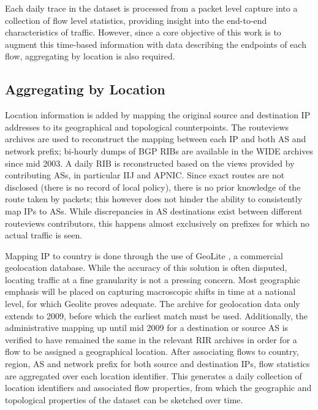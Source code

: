 Each daily trace in the dataset is processed from a packet level capture into a collection of flow level statistics, providing insight into the end-to-end characteristics of traffic. 
However, since a core objective of this work is to augment this time-based information with data describing the endpoints of each flow, aggregating by location is also required. 

\subsection{Aggregating by Location}

Location information is added by mapping the original source and destination \ac{IP} addresses to its geographical and topological counterpoints. 
The routeviews archives \cite{routeviews} are used to reconstruct the mapping between each \ac{IP} and both \ac{AS} and network prefix; bi-hourly dumps of \ac{BGP} \acp{RIB} are available in the \acs{WIDE} archives since mid 2003. 
A daily \ac{RIB} is reconstructed based on the views provided by contributing \acp{AS}, in particular \ac{IIJ} and \ac{APNIC}.
Since exact routes are not disclosed (there is no record of local policy), there is no prior knowledge of the route taken by packets; this however does not hinder the ability to consistently map \acp{IP} to \acp{AS}.
While discrepancies in \ac{AS} destinations exist between different routeviews contributors, this happens almost exclusively on prefixes for which no actual traffic is seen. 

Mapping \ac{IP} to country is done through the use of GeoLite \cite{maxmind}, a commercial geolocation database. 
While the accuracy of this solution is often disputed, locating traffic at a fine granularity is not a pressing concern.
Most geographic emphasis will be placed on capturing macroscopic shifts in time at a national level, for which Geolite proves adequate.
The archive for geolocation data only extends to 2009, before which the earliest match must be used.
Additionally, the administrative mapping up until mid 2009 for a destination or source \ac{AS} is verified to have remained the same in the relevant \ac{RIR} archives in order for a flow to be assigned a geographical location.
After associating flows to country, region, \ac{AS} and network prefix for both source and destination \acp{IP}, flow statistics are aggregated over each location identifier. 
This generates a daily collection of location identifiers and associated flow properties, from which the geographic and topological properties of the dataset can be sketched over time.
